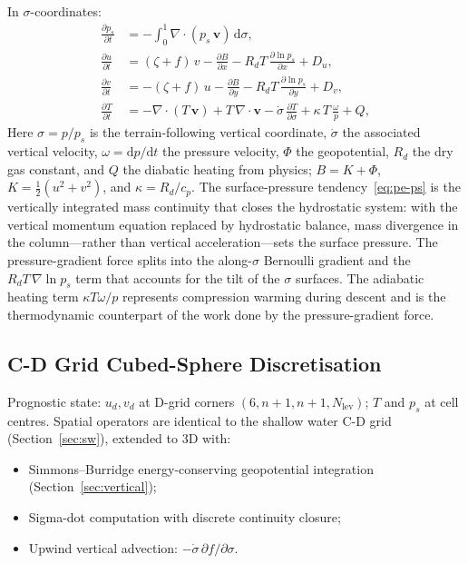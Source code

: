 \documentclass[11pt,twoside]{report}
\newcommand{\dd}{\mathrm{d}}
\newcommand{\pp}{\partial}
\newcommand{\half}{\tfrac{1}{2}}
\newcommand{\Rd}{R_d}
\newcommand{\cpd}{c_p}
\newcommand{\vect}[1]{\bm{#1}}
\newcommand{\grad}{\nabla}
\newcommand{\divg}{\nabla\!\cdot\!}
\begin{document}
In $\sigma$-coordinates:
\begin{align}
  \frac{\pp p_s}{\pp t} &= -\int_0^1 \divg(p_s\,\vect{v})\,\dd\sigma,
  \label{eq:pe-ps}\\
  \frac{\pp u}{\pp t} &= (\zeta+f)\,v - \frac{\pp B}{\pp x}
  - \Rd T\,\frac{\pp\ln p_s}{\pp x} + D_u,
  \label{eq:pe-u}\\
  \frac{\pp v}{\pp t} &= -(\zeta+f)\,u - \frac{\pp B}{\pp y}
  - \Rd T\,\frac{\pp\ln p_s}{\pp y} + D_v,
  \label{eq:pe-v}\\
  \frac{\pp T}{\pp t} &= -\divg(T\,\vect{v})+T\,\divg\vect{v}
  - \dot\sigma\,\frac{\pp T}{\pp\sigma}
  + \kappa\,T\,\frac{\omega}{p} + Q,
  \label{eq:pe-T}
\end{align}
Here $\sigma=p/p_s$ is the terrain-following vertical coordinate, $\dot\sigma$
the associated vertical velocity, $\omega=\dd p/\dd t$ the pressure velocity,
$\Phi$ the geopotential, $\Rd$ the dry gas constant, and $Q$ the diabatic
heating from physics; $B=K+\Phi$, $K=\half(u^2+v^2)$, and $\kappa=\Rd/\cpd$.
The surface-pressure tendency~\eqref{eq:pe-ps} is the vertically integrated mass
continuity that closes the hydrostatic system: with the vertical momentum
equation replaced by hydrostatic balance, mass divergence in the column---rather
than vertical acceleration---sets the surface pressure. The pressure-gradient
force splits into the along-$\sigma$ Bernoulli gradient and the
$\Rd T\,\grad\ln p_s$ term that accounts for the tilt of the $\sigma$ surfaces.
The adiabatic heating term $\kappa T\omega/p$ represents compression
warming during descent and is the thermodynamic counterpart of the work done by
the pressure-gradient force.

\subsection{C-D Grid Cubed-Sphere Discretisation}
\label{sec:pe-cdgrid}

Prognostic state: $u_d,v_d$ at D-grid corners $(6,n\!+\!1,n\!+\!1,N_{\mathrm{lev}})$;
$T$ and $p_s$ at cell centres.  Spatial operators are identical to the
shallow water C-D grid (Section~\ref{sec:sw}), extended to 3D with:
\begin{itemize}[nosep]
  \item Simmons--Burridge energy-conserving geopotential integration
    \citep{SimmonsBurridge1981} (Section~\ref{sec:vertical});
  \item Sigma-dot computation with discrete continuity closure;
  \item Upwind vertical advection: $-\dot\sigma\,\pp f/\pp\sigma$.
\end{itemize}
\end{document}
